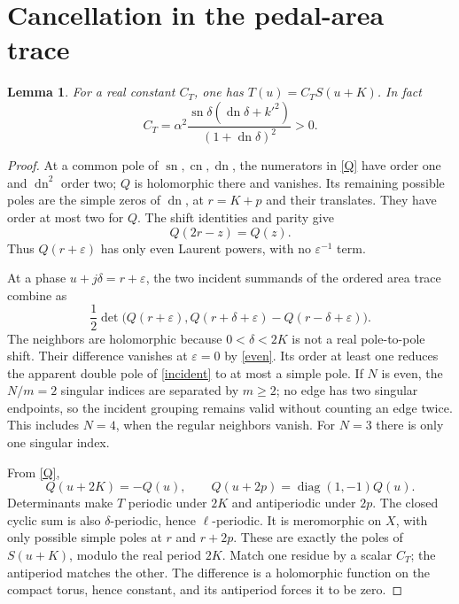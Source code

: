 \documentclass[11pt]{article}
\newtheorem{lemma}{Lemma}
\newcommand{\sn}{\operatorname{sn}}
\newcommand{\cn}{\operatorname{cn}}
\newcommand{\dn}{\operatorname{dn}}
\begin{document}
\section{Cancellation in the pedal-area trace}
\begin{lemma}\label{Tlemma}
For a real constant $C_T$, one has $T(u)=C_T S(u+K)$. In fact
\begin{equation}\label{CT}
 C_T=\alpha^2\frac{\sn\delta(\dn\delta+k'^2)}{(1+\dn\delta)^2}>0.
\end{equation}
\end{lemma}
\begin{proof}
At a common pole of $\sn,\cn,\dn$, the numerators in \eqref{Q}
have order one and $\dn^2$ order two; $Q$ is holomorphic there and
vanishes. Its remaining possible poles are the simple zeros of $\dn$,
at $r=K+p$ and their translates. They have order at most two for $Q$.
The shift identities and parity give
\begin{equation}\label{even}
 Q(2r-z)=Q(z).
\end{equation}
Thus $Q(r+\varepsilon)$ has only even Laurent powers, with no
$\varepsilon^{-1}$ term.

At a phase $u+j\delta=r+\varepsilon$, the two incident summands
of the ordered area trace combine as
\begin{equation}\label{incident}
 \frac12\det\bigl(Q(r+\varepsilon),
            Q(r+\delta+\varepsilon)-Q(r-\delta+\varepsilon)\bigr).
\end{equation}
The neighbors are holomorphic because $0<\delta<2K$ is not a
real pole-to-pole shift. Their difference vanishes at $\varepsilon=0$
by \eqref{even}. Its order at least one reduces the apparent double
pole of \eqref{incident} to at most a simple pole. If $N$ is even,
the $N/m=2$ singular indices are separated by $m\geq2$; no edge has
two singular endpoints, so the incident grouping remains valid without
counting an edge twice. This includes $N=4$, when the regular
neighbors vanish. For $N=3$ there is only one singular index.

From \eqref{Q},
\[
 Q(u+2K)=-Q(u),\qquad
 Q(u+2p)=\operatorname{diag}(1,-1)Q(u).
\]
Determinants make $T$ periodic under $2K$ and antiperiodic under $2p$.
The closed cyclic sum is also $\delta$-periodic, hence $\ell$-periodic.
It is meromorphic on $X$, with only possible simple poles at $r$ and
$r+2p$. These are exactly the poles of $S(u+K)$, modulo the real
period $2K$. Match one residue by a scalar $C_T$; the antiperiod
matches the other. The difference is a holomorphic function on the
compact torus, hence constant, and its antiperiod forces it to be zero.


\end{proof}
\end{document}
